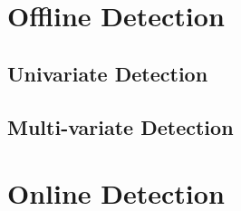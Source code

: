 \documentclass{article}
\begin{document}
  \section{Offline Detection}
  \subsection{Univariate Detection}
  \subsection{Multi-variate Detection}
  \section{Online Detection}
\end{document}
